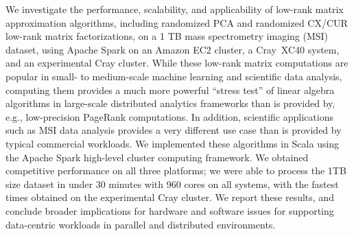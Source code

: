 We investigate the performance, scalability, and applicability of low-rank matrix approximation algorithms, including randomized PCA and randomized CX/CUR low-rank matrix factorizations, on a 1 TB mass spectrometry imaging (MSI) dataset, using Apache Spark on an Amazon EC2 cluster, a 
Cray~XC40 system, and an experimental Cray cluster.
While these low-rank matrix computations are popular in small- to medium-scale machine learning and scientific data analysis, computing them provides a much more powerful ``stress test'' of linear algebra algorithms in large-scale distributed analytics frameworks than is provided by, e.g., low-precision PageRank computations.
In addition, scientific applications such as MSI data analysis provides a very different use case 
than is provided by typical commercial workloads.
We implemented these algorithms in Scala using the Apache Spark high-level cluster computing framework.  
We obtained competitive performance on all three platforms; we were able to process the 1TB size dataset in under 30 minutes with 960 cores on all systems, with the fastest times obtained on the experimental Cray cluster.
We report these results, and conclude broader implications for hardware and software issues for supporting data-centric workloads in parallel and distributed environments.  

